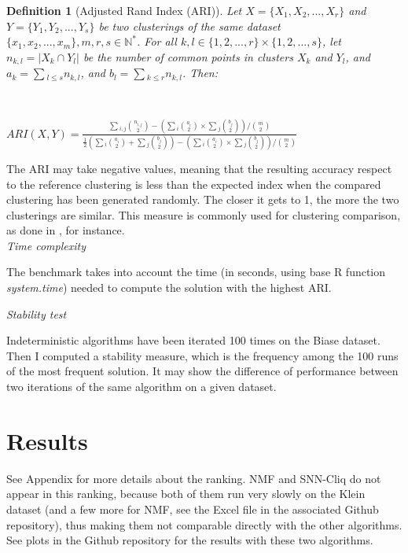 \documentclass{report}
\newtheorem{definition}{Definition}[section]
\begin{document}
\begin{definition}[Adjusted Rand Index (ARI)]\label{ARI}{
Let $X = \{X_1, X_2, ..., X_r\}$ and $Y = \{Y_1, Y_2, ..., Y_s\}$ be two clusterings of the same dataset $\{x_1, x_2, ..., x_m\}, m, r, s \in \mathbb{N^{*}}$. For all $k,l \in \{1,2,...,r\} \times \{1,2,...,s\}$, let $n_{k,l} = |X_k \cap Y_l|$ be the number of common points in clusters $X_k$ and $Y_l$, and $a_k = \sum{_{l \leq s}}{n_{k,l}}$, and $b_l = \sum{_{k \leq r}}{n_{k,l}}$. Then:}\end{definition}\\

\begin{center}
$ARI(X, Y) = \frac{\sum{_{i,j}}{{n_{i,j}}\choose{2}} - (\sum{_i}{{a_i}\choose{2}} \times \sum{_j}{{b_j}\choose{2}})/{{m}\choose{2}}}{\frac{1}{2} (\sum{_i}{{a_i}\choose{2}} + \sum{_j}{{b_j}\choose{2}}) - (\sum{_i}{{a_i}\choose{2}} \times \sum{_j}{{b_j}\choose{2}})/{{m}\choose{2}}}$
\end{center}

The ARI may take negative values, meaning that the resulting accuracy respect to the reference clustering is less than the expected index when the compared clustering has been generated randomly. The closer it gets to 1, the more the two clusterings are similar. This measure is commonly used for clustering comparison, as done in \cite{kiselev2016sc3}\cite{jaskowiak2014selection}, for instance.\\

\bigskip
\noindent \textit{Time complexity}
\bigskip

The benchmark takes into account the time (in seconds, using base R function \emph{system.time}) needed to compute the solution with the highest ARI.

\bigskip
\noindent \textit{Stability test}
\bigskip

Indeterministic algorithms have been iterated 100 times on the Biase dataset. Then I computed a stability measure, which is the frequency among the 100 runs of the most frequent solution. It may show the difference of performance between two iterations of the same algorithm on a given dataset.

\section{Results}

See Appendix for more details about the ranking. NMF and SNN-Cliq do not appear in this ranking, because both of them run very slowly on the Klein dataset (and a few more for NMF, see the Excel file in the associated Github repository), thus making them not comparable directly with the other algorithms. See plots in the Github repository for the results with these two algorithms.
\end{document}
